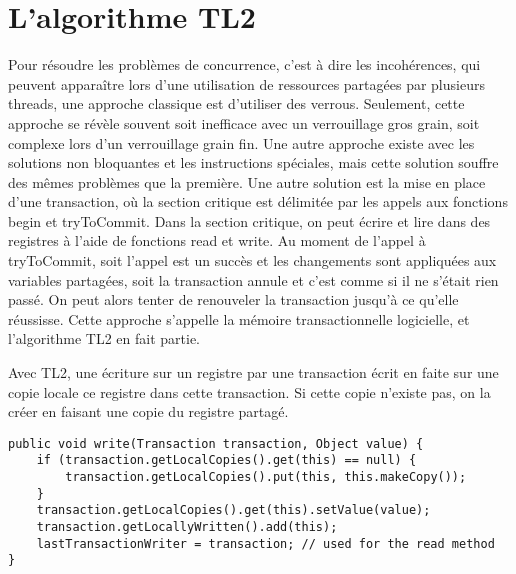 \documentclass[10pt, a4paper]{article}
\title{\mytitle}
\author{\myauthor\hspace{1em}\\\contact\\Université de Nantes\hspace{0.5em}-\hspace{0.5em}\mymodule}
\date{}
\begin{document}
    \maketitle
    \begin{abstract}
	Ce document est un rapport du projet de mémoire transactionelle logicielle du module de programmation multi-coeurs. On discutera en particulier de la propriété de vivacité sur les transactions garantie par l’algorithme TL2.
    \end{abstract}

\section{L'algorithme TL2}
Pour résoudre les problèmes de concurrence, c'est à dire les incohérences, qui peuvent apparaître lors d'une utilisation de ressources partagées par plusieurs threads, une approche classique est d'utiliser des verrous.
Seulement, cette approche se révèle souvent soit inefficace avec un verrouillage gros grain, soit complexe lors d'un verrouillage grain fin. Une autre approche existe avec les solutions non bloquantes et les instructions spéciales, mais cette solution souffre des mêmes problèmes que la première. Une autre solution est la mise en place d'une transaction, où la section critique est délimitée par les appels aux fonctions begin et tryToCommit. Dans la section critique, on peut écrire et lire dans des registres à l'aide de fonctions read et write. Au moment de l'appel à tryToCommit, soit l'appel est un succès et les changements sont appliquées aux variables partagées, soit la transaction annule et c'est comme si il ne s'était rien passé. On peut alors tenter de renouveler la transaction jusqu'à ce qu'elle réussisse. Cette approche s'appelle la mémoire transactionnelle logicielle, et l'algorithme TL2 en fait partie. 

Avec TL2, une écriture sur un registre par une transaction écrit en faite sur une copie locale ce registre dans cette transaction. Si cette copie n'existe pas, on la créer en faisant une copie du registre partagé.
\begin{lstlisting}[caption = write]
public void write(Transaction transaction, Object value) {
    if (transaction.getLocalCopies().get(this) == null) {
        transaction.getLocalCopies().put(this, this.makeCopy());
    }
    transaction.getLocalCopies().get(this).setValue(value);
    transaction.getLocallyWritten().add(this);
    lastTransactionWriter = transaction; // used for the read method
}
\end{lstlisting}
\end{document}

